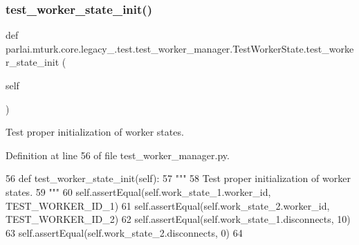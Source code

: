 \mbox{\label{classparlai_1_1mturk_1_1core_1_1legacy__2018_1_1test_1_1test__worker__manager_1_1TestWorkerState_a7e2f9e49ab2bcaf0fc93c2d65ca86393}} 
\subsubsection{\texorpdfstring{test\+\_\+worker\+\_\+state\+\_\+init()}{test\_worker\_state\_init()}}
{\footnotesize\ttfamily def parlai.\+mturk.\+core.\+legacy\+\_.\+test.\+test\+\_\+worker\+\_\+manager.\+Test\+Worker\+State.\+test\+\_\+worker\+\_\+state\+\_\+init (\begin{DoxyParamCaption}\item[{}]{self }\end{DoxyParamCaption})}

\begin{DoxyVerb}Test proper initialization of worker states.
\end{DoxyVerb}
 

Definition at line 56 of file test\+\_\+worker\+\_\+manager.\+py.


\begin{DoxyCode}
56     \textcolor{keyword}{def }test\_worker\_state\_init(self):
57         \textcolor{stringliteral}{"""}
58 \textcolor{stringliteral}{        Test proper initialization of worker states.}
59 \textcolor{stringliteral}{        """}
60         self.assertEqual(self.work\_state\_1.worker\_id, TEST\_WORKER\_ID\_1)
61         self.assertEqual(self.work\_state\_2.worker\_id, TEST\_WORKER\_ID\_2)
62         self.assertEqual(self.work\_state\_1.disconnects, 10)
63         self.assertEqual(self.work\_state\_2.disconnects, 0)
64 
\end{DoxyCode}


